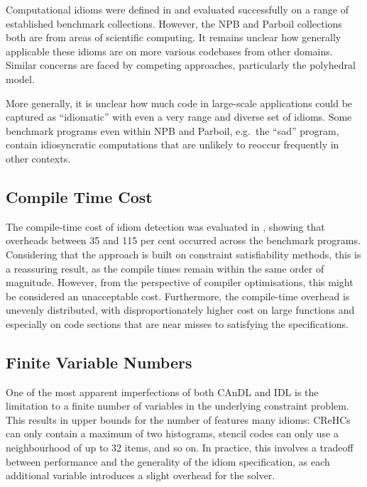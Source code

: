     Computational idioms were defined in
     and
    evaluated successfully on a range of established benchmark collections.
    However, the NPB and Parboil collections both are from areas of scientific
    computing.
    It remains unclear how generally applicable these idioms are on more
    various codebases from other domains.
    Similar concerns are faced by competing approaches, particularly the
    polyhedral model.

    More generally, it is unclear how much code in large-scale applications
    could be captured as ``idiomatic'' with even a very range and diverse set of
    idioms.
    Some benchmark programs even within NPB and Parboil, e.g.\ the ``sad''
    program, contain idiosyncratic computations that are unlikely to reoccur
    frequently in other contexts.

\subsection*{Compile Time Cost}

    The compile-time cost of idiom detection was evaluated in
    , showing that overheads between 35 and 115 per cent
    occurred across the benchmark programs.
    Considering that the approach is built on constraint satisfiability
    methods, this is a reassuring result, as the compile times remain within the
    same order of magnitude.
    However, from the perspective of compiler optimisations, this might be
    considered an unacceptable cost.
    Furthermore, the compile-time overhead is unevenly distributed, with
    disproportionately higher cost on large functions and especially on code
    sections that are near misses to satisfying the specifications.

\subsection*{Finite Variable Numbers}

    One of the most apparent imperfections of both CAnDL and IDL is the
    limitation to a finite number of variables in the underlying constraint
    problem.
    This results in upper bounds for the number of features many idioms:
    CReHCs can only contain a maximum of two histograms, stencil codes can only
    use a neighbourhood of up to 32 items, and so on.
    In practice, this involves a tradeoff between performance and the generality
    of the idiom specification, as each additional variable introduces a slight
    overhead for the solver.

